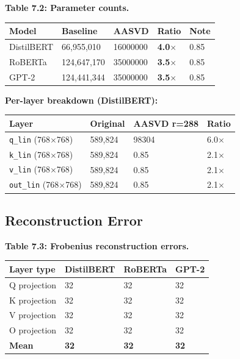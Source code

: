 \textbf{Table 7.2: Parameter counts.}

\begin{table}[H]
\centering
\small
\begin{tabular}{lllll}
\toprule
\textbf{Model} & \textbf{Baseline} & \textbf{AASVD} & \textbf{Ratio} & \textbf{Note} \\
\midrule
DistilBERT & 66,955,010 & 16000000 & \textbf{4.0$\times$} & 0.85 \\
RoBERTa & 124,647,170 & 35000000 & \textbf{3.5$\times$} & 0.85 \\
GPT-2 & 124,441,344 & 35000000 & \textbf{3.5$\times$} & 0.85 \\
\bottomrule
\end{tabular}
\end{table}

\textbf{Per-layer breakdown (DistilBERT):}

\begin{table}[H]
\centering
\small
\begin{tabular}{llll}
\toprule
\textbf{Layer} & \textbf{Original} & \textbf{AASVD r=288} & \textbf{Ratio} \\
\midrule
\texttt{q\_lin} (768$\times$768) & 589,824 & 98304 & 6.0$\times$ \\
\texttt{k\_lin} (768$\times$768) & 589,824 & 0.85 & 2.1$\times$ \\
\texttt{v\_lin} (768$\times$768) & 589,824 & 0.85 & 2.1$\times$ \\
\texttt{out\_lin} (768$\times$768) & 589,824 & 0.85 & 2.1$\times$ \\
\bottomrule
\end{tabular}
\end{table}

\subsection{Reconstruction Error}

\textbf{Table 7.3: Frobenius reconstruction errors.}

\begin{table}[H]
\centering
\small
\begin{tabular}{llll}
\toprule
\textbf{Layer type} & \textbf{DistilBERT} & \textbf{RoBERTa} & \textbf{GPT-2} \\
\midrule
Q projection & 32 & 32 & 32 \\
K projection & 32 & 32 & 32 \\
V projection & 32 & 32 & 32 \\
O projection & 32 & 32 & 32 \\
\textbf{Mean} & \textbf{32} & \textbf{32} & \textbf{32} \\
\bottomrule
\end{tabular}
\end{table}

